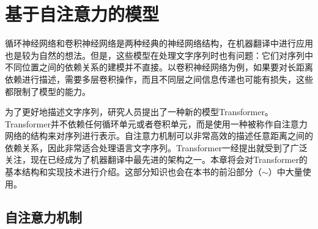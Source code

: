 
%


\renewcommand\figurename{图}%
\renewcommand\tablename{表}%


\chapter{基于自注意力的模型}

循环神经网络和卷积神经网络是两种经典的神经网络结构，在机器翻译中进行应用也是较为自然的想法。但是，这些模型在处理文字序列时也有问题：它们对序列中不同位置之间的依赖关系的建模并不直接。以卷积神经网络为例，如果要对长距离依赖进行描述，需要多层卷积操作，而且不同层之间信息传递也可能有损失，这些都限制了模型的能力。

为了更好地描述文字序列，研究人员提出了一种新的模型Transformer。Transformer并不依赖任何循环单元或者卷积单元，而是使用一种被称作自注意力网络的结构来对序列进行表示。自注意力机制可以非常高效的描述任意距离之间的依赖关系，因此非常适合处理语言文字序列。Transformer一经提出就受到了广泛关注，现在已经成为了机器翻译中最先进的架构之一。本章将会对Transformer的基本结构和实现技术进行介绍。这部分知识也会在本书的前沿部分（{\chapterthirteen}$\sim${\chaptereighteen}）中大量使用。

\section{自注意力机制}
\vspace{0.5em}
\label{sec:12.1}

